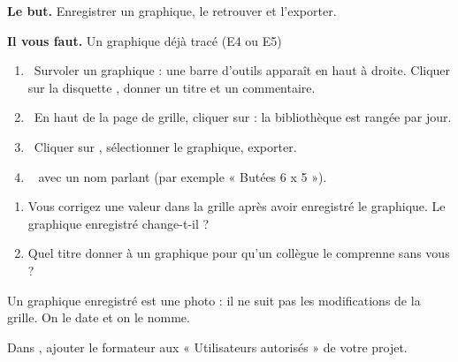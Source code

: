 \documentclass[10pt,a4paper]{article}
\begin{document}
\thispagestyle{fancy}
\begin{tcolorbox}[boite]\textbf{Le but.} Enregistrer un graphique, le retrouver et l'exporter.\par\textbf{Il vous faut.} Un graphique déjà tracé (E4 ou E5)\end{tcolorbox}
\begin{enumerate}[label=\textcolor{cyan}{\textbf{\arabic*.}},leftmargin=15pt,itemsep=1.5pt]
\item \tagE\ Survoler un graphique : une barre d'outils apparaît en haut à droite. Cliquer sur la disquette , donner un titre et un commentaire.
\item \tagE\ En haut de la page de grille, cliquer sur  : la bibliothèque est rangée par jour.
\item \tagE\ Cliquer sur , sélectionner le graphique, exporter.
\item \tagE\  avec un nom parlant (par exemple « Butées 6 x 5 »).
\end{enumerate}
\begin{enumerate}[label=\textcolor{cyan}{\textbf{Q\arabic*.}},leftmargin=22pt]
\item Vous corrigez une valeur dans la grille après avoir enregistré le graphique. Le graphique enregistré change-t-il ?\reponse[1]
\item Quel titre donner à un graphique pour qu'un collègue le comprenne sans vous ?\reponse[1]
\end{enumerate}
\begin{tcolorbox}[retenir]Un graphique enregistré est une photo : il ne suit pas les modifications de la grille. On le date et on le nomme.\end{tcolorbox}
\begin{tcolorbox}[plus]Dans , ajouter le formateur aux « Utilisateurs autorisés » de votre projet.\end{tcolorbox}
\end{document}
